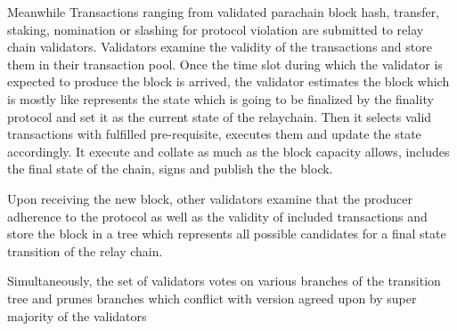 Meanwhile Transactions ranging from validated parachain block hash, transfer, staking, nomination or slashing for protocol violation are submitted to relay chain validators. Validators examine the validity of the transactions and store them in their transaction pool. Once the time slot during which the validator is expected to produce the block is arrived, the validator estimates the block which is mostly like represents the state which is going to be finalized by the finality protocol and set it as the current state of the relaychain. Then it selects valid transactions with fulfilled pre-requisite, executes them and update the state accordingly. It execute and collate as much as the block capacity allows, includes the final state of the chain, signs and publish the the block.

Upon receiving the new block, other validators examine that the producer adherence to the protocol as well as the validity of included transactions and store the block in a tree which represents all possible candidates for a final state transition of the relay chain.

Simultaneously, the set of validators votes on various branches of the transition tree and prunes branches which conflict with version agreed upon by super majority of the validators


